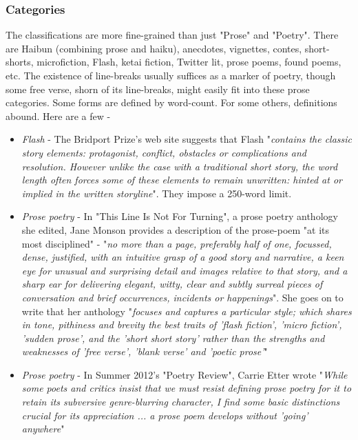 \documentclass[11pt]{article}
\begin{document}
\subsubsection*{Categories}
The classifications are more fine-grained than just "Prose" and "Poetry". There are Haibun (combining prose and haiku), anecdotes, vignettes, contes, short-shorts, microfiction, Flash, ketai fiction, Twitter lit, prose poems, found poems, etc. The existence of line-breaks usually suffices as a marker of poetry, though some free verse, shorn of its line-breaks, might easily fit into these prose categories. Some forms are defined by word-count. For some others, definitions abound. Here are a few -
\begin{itemize}
\item \textit{Flash} - The Bridport Prize's web site suggests that Flash "\textit{contains the classic story elements: protagonist, conflict, obstacles or complications and resolution. However unlike the case with a traditional short story, the word length often forces some of these elements to remain unwritten: hinted at or implied in the written storyline}". They impose a 250-word limit.
\item \textit{Prose poetry} - In "This Line Is Not For Turning", a prose poetry anthology she edited, Jane Monson provides a description of the prose-poem "at its most disciplined" - "\textit{no more than a page, preferably half of one, focussed, dense, justified, with an intuitive grasp of a good story and narrative, a keen eye for unusual and surprising detail  and images relative to that story, and a sharp ear for delivering elegant, witty, clear and subtly surreal pieces of conversation and brief occurrences, incidents or happenings}". She goes on to write that her anthology "\textit{focuses and captures a particular style; which shares in tone, pithiness and brevity the best traits of 'flash fiction', 'micro fiction', 'sudden prose', and the 'short short story' rather than the strengths and weaknesses of 'free verse', 'blank verse' and 'poetic prose'}" 
\item \textit{Prose poetry} - In Summer 2012's "Poetry Review", Carrie Etter wrote "\textit{While some poets and critics insist that we must resist defining prose poetry for it to retain its subversive genre-blurring character, I find some basic distinctions crucial for its appreciation ... a prose poem develops without 'going' anywhere}"
\end{itemize}
\end{document}
